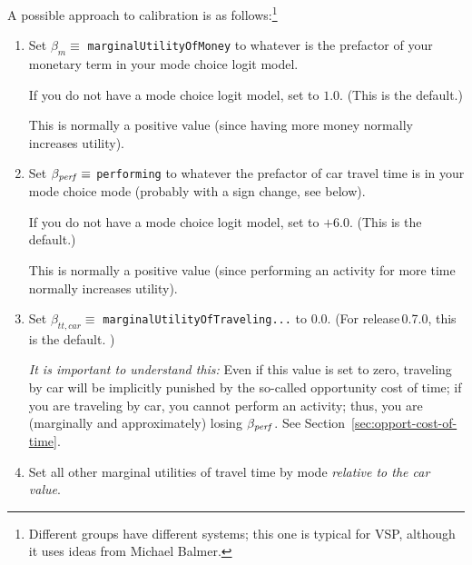 A possible approach to calibration is as follows:\footnote{%
%
Different groups have different systems; this one is typical for VSP, although it uses ideas from Michael Balmer.
%
}
\begin{enumerate}



\item Set $\beta_{m} \equiv$ \verb$marginalUtilityOfMoney$ to whatever is the prefactor of your monetary term in your mode choice logit model.

If you do not have a mode choice logit model, set to $1.0$.  (This is the default.)

This is normally a positive value (since having more money normally increases utility).

\item Set $\beta_{\it perf} \equiv$ \verb$performing$ to whatever the prefactor of car travel time is in your mode choice mode (probably with a sign change, see below).

If you do not have a mode choice logit model, set to $+6.0$.  (This is the default.)

This is normally a positive value (since performing an activity for more time normally increases utility).

\item Set $\beta_{tt,car} \equiv$ \verb$marginalUtilityOfTraveling...$ to $0.0$. (For release\,0.7.0, this is the default. )

\emph{It is important to understand this:}  Even if this value is set to zero, traveling by car will be implicitly punished by the so-called opportunity cost of time; if you are traveling by car, you cannot perform an activity; thus, you are (marginally and approximately) losing $\beta_{\it perf}$.  See Section~\ref{sec:opport-cost-of-time}.

\item Set all other marginal utilities of travel time by mode \emph{relative to the car value}.


\end{enumerate}
